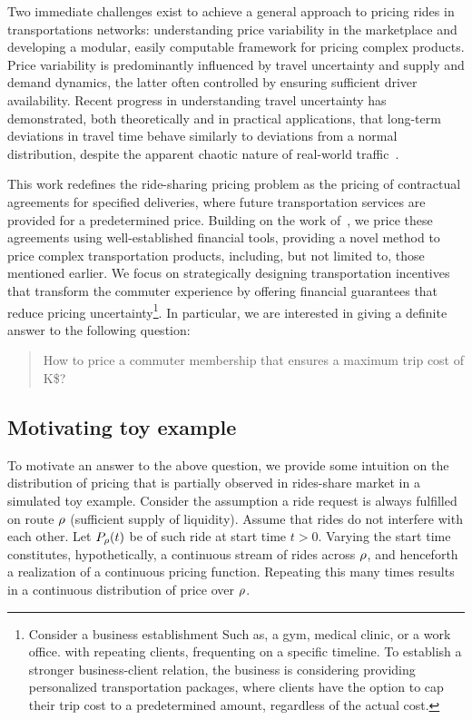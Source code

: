 \documentclass[12pt]{article}
\begin{document}
Two immediate challenges exist to achieve a general approach to pricing rides in transportations networks: 
understanding price variability in the marketplace and developing a modular, easily computable framework for pricing complex products. Price variability is predominantly influenced by travel uncertainty and supply and demand dynamics, the latter often controlled by ensuring sufficient driver availability. Recent progress in understanding travel uncertainty has demonstrated, both theoretically and in practical applications, that long-term deviations in travel time behave similarly to deviations from a normal distribution, despite the apparent chaotic nature of real-world traffic~\cite{elmasri2020predictive, woodard2017predicting}.

This work redefines the ride-sharing pricing problem as the pricing of contractual agreements for specified deliveries, where future transportation services are provided for a predetermined price. Building on the work of~\cite{elmasri2020predictive}, we price these agreements using well-established financial tools, providing a novel method to price complex transportation products, including, but not limited to, those mentioned earlier. We focus on strategically designing transportation incentives that transform the commuter experience by offering financial guarantees that reduce pricing uncertainty\footnote{Consider a business establishment Such as, a gym, medical clinic, or a work office. with repeating clients, frequenting on a specific timeline. To establish a stronger business-client relation, the business is considering providing personalized transportation packages, where clients have the option to cap their trip cost to a predetermined amount, regardless of the actual cost.}. In particular, we are interested in giving a definite answer to the following question:
\begin{quote}
    How to price a commuter membership that ensures a maximum trip cost of K\$?
\end{quote}


\subsection{Motivating toy example}
To motivate an answer to the above question, we provide some intuition on the distribution of pricing that is partially observed in rides-share market in a simulated toy example. Consider the assumption a ride request is always fulfilled on route $\rho$ (sufficient supply of liquidity). Assume that rides do not interfere with each other. Let $P_\rho(t)$ be of such ride at start time $t>0$. Varying the start time constitutes, hypothetically, a continuous stream of rides across $\rho$, and henceforth a realization of a continuous pricing function. Repeating this many times results in a continuous distribution of price over $\rho$. 
\end{document}
